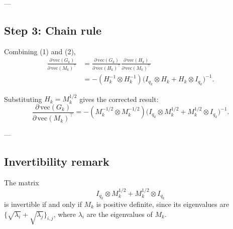 \documentclass[10pt]{article}
\begin{document}
---

\subsection*{Step 3: Chain rule}

Combining (1) and (2),
\begin{align*}
\frac{\partial\,\mathrm{vec}(G_k)}{\partial\,\mathrm{vec}(M_k)^{\!\top}}
&=
\frac{\partial\,\mathrm{vec}(G_k)}{\partial\,\mathrm{vec}(H_k)^{\!\top}}
\frac{\partial\,\mathrm{vec}(H_k)}{\partial\,\mathrm{vec}(M_k)^{\!\top}} \\[1mm]
&=
- (H_k^{-1} \otimes H_k^{-1})
\bigl(I_{q_k} \otimes H_k + H_k \otimes I_{q_k}\bigr)^{-1}.
\end{align*}

Substituting $H_k = M_k^{1/2}$ gives the corrected result:
\[
\boxed{
\displaystyle
\frac{\partial\,\mathrm{vec}(G_k)}{\partial\,\mathrm{vec}(M_k)^{\!\top}}
= - (M_k^{-1/2} \otimes M_k^{-1/2})
\bigl(I_{q_k} \otimes M_k^{1/2} + M_k^{1/2} \otimes I_{q_k}\bigr)^{-1}.
}
\]

---

\subsection*{Invertibility remark}

The matrix 
\[
I_{q_k} \otimes M_k^{1/2} + M_k^{1/2} \otimes I_{q_k}
\]
is invertible if and only if $M_k$ is positive definite,
since its eigenvalues are $\{\sqrt{\lambda_i}+\sqrt{\lambda_j}\}_{i,j}$,
where $\lambda_i$ are the eigenvalues of $M_k$.
\end{document}
